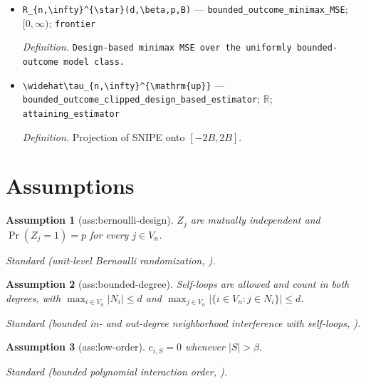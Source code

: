 \documentclass{article}
\newtheorem{assumption}{Assumption}
\begin{document}
\begin{itemize}
  \item \texttt{R\_\allowbreak{}\{n,\allowbreak{}\textbackslash{}\allowbreak{}infty\}\allowbreak{}\textasciicircum{}\{\textbackslash{}\allowbreak{}star\}\allowbreak{}(d,\allowbreak{}\textbackslash{}\allowbreak{}beta,\allowbreak{}p,\allowbreak{}B)} --- \texttt{bounded\_\allowbreak{}outcome\_\allowbreak{}minimax\_\allowbreak{}MSE}; \([0,\infty)\); \texttt{frontier}
  \par\smallskip\noindent\emph{Definition.} \texttt{Design-\allowbreak{}based minimax MSE over the uniformly bounded-\allowbreak{}outcome model class.}
  \item \texttt{\textbackslash{}\allowbreak{}widehat\textbackslash{}\allowbreak{}tau\_\allowbreak{}\{n,\allowbreak{}\textbackslash{}\allowbreak{}infty\}\allowbreak{}\textasciicircum{}\{\textbackslash{}\allowbreak{}mathrm\{up\}\allowbreak{}\}\allowbreak{}} --- \texttt{bounded\_\allowbreak{}outcome\_\allowbreak{}clipped\_\allowbreak{}design\_\allowbreak{}based\_\allowbreak{}estimator}; \(\mathbb R\); \texttt{attaining\_\allowbreak{}estimator}
  \par\smallskip\noindent\emph{Definition.} Projection of SNIPE onto \([-2B,2B]\).
\end{itemize}

\section{Assumptions}

\begin{assumption}[ass:bernoulli-design]\label{ass:bernoulli-design}
\(Z_j\) are mutually independent and \(\Pr(Z_j=1)=p\) for every \(j\in V_n\).
\par\smallskip\noindent\emph{Standard} (unit-level Bernoulli randomization, \cite{CortezRodriguezEichhornYu2023}).
\end{assumption}

\begin{assumption}[ass:bounded-degree]\label{ass:bounded-degree}
Self-loops are allowed and count in both degrees, with \(\max_{i\in V_n}|N_i|\le d\) and \(\max_{j\in V_n}|\{i\in V_n:j\in N_i\}|\le d\).
\par\smallskip\noindent\emph{Standard} (bounded in- and out-degree neighborhood interference with self-loops, \cite{CortezRodriguezEichhornYu2023}).
\end{assumption}

\begin{assumption}[ass:low-order]\label{ass:low-order}
\(c_{i,S}=0\) whenever \(|S|>\beta\).
\par\smallskip\noindent\emph{Standard} (bounded polynomial interaction order, \cite{CortezRodriguezEichhornYu2023}).
\end{assumption}
\end{document}
